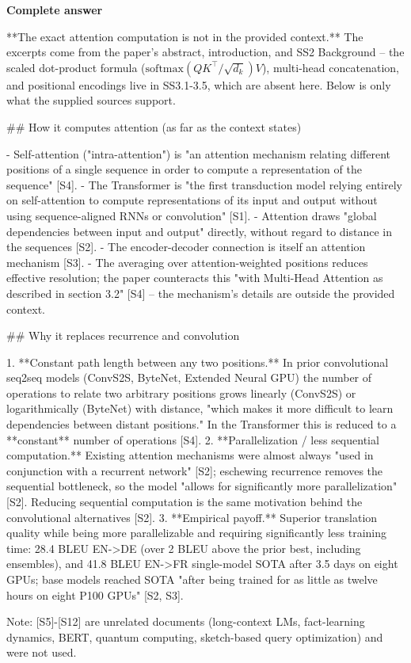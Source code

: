 \documentclass[10pt]{article}
\begin{document}
\textbf{Complete answer}
\begin{AnswerText}
**The exact attention computation is not in the provided context.** The excerpts come from the paper's abstract, introduction, and SS2 Background -- the scaled dot-product formula ($\mathrm{softmax}(QK^\top/\sqrt{d_k})V$), multi-head concatenation, and positional encodings live in SS3.1-3.5, which are absent here. Below is only what the supplied sources support.

## How it computes attention (as far as the context states)

- Self-attention ("intra-attention") is "an attention mechanism relating different positions of a single sequence in order to compute a representation of the sequence" [S4].
- The Transformer is "the first transduction model relying entirely on self-attention to compute representations of its input and output without using sequence-aligned RNNs or convolution" [S1].
- Attention draws "global dependencies between input and output" directly, without regard to distance in the sequences [S2].
- The encoder-decoder connection is itself an attention mechanism [S3].
- The averaging over attention-weighted positions reduces effective resolution; the paper counteracts this "with Multi-Head Attention as described in section 3.2" [S4] -- the mechanism's details are outside the provided context.

## Why it replaces recurrence and convolution

1. **Constant path length between any two positions.** In prior convolutional seq2seq models (ConvS2S, ByteNet, Extended Neural GPU) the number of operations to relate two arbitrary positions grows linearly (ConvS2S) or logarithmically (ByteNet) with distance, "which makes it more difficult to learn dependencies between distant positions." In the Transformer this is reduced to a **constant** number of operations [S4].
2. **Parallelization / less sequential computation.** Existing attention mechanisms were almost always "used in conjunction with a recurrent network" [S2]; eschewing recurrence removes the sequential bottleneck, so the model "allows for significantly more parallelization" [S2]. Reducing sequential computation is the same motivation behind the convolutional alternatives [S2].
3. **Empirical payoff.** Superior translation quality while being more parallelizable and requiring significantly less training time: 28.4 BLEU EN->DE (over 2 BLEU above the prior best, including ensembles), and 41.8 BLEU EN->FR single-model SOTA after 3.5 days on eight GPUs; base models reached SOTA "after being trained for as little as twelve hours on eight P100 GPUs" [S2, S3].

Note: [S5]-[S12] are unrelated documents (long-context LMs, fact-learning dynamics, BERT, quantum computing, sketch-based query optimization) and were not used.
\end{AnswerText}
\end{document}
